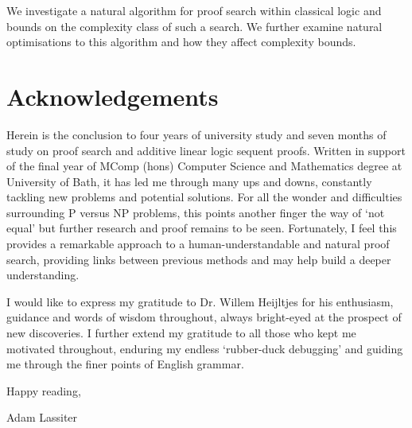 \abstract
    We investigate a natural algorithm for proof search within classical logic and bounds on the complexity class of such a search.
    We further examine natural optimisations to this algorithm and how they affect complexity bounds.
\newpage

\section*{Acknowledgements}
    Herein is the conclusion to four years of university study and seven months of study on proof search and additive linear logic sequent proofs.
    Written in support of the final year of MComp (hons) Computer Science and Mathematics degree at University of Bath, it has led me through many ups and downs, constantly tackling new problems and potential solutions.
    For all the wonder and difficulties surrounding P versus NP problems, this points another finger the way of `not equal' but further research and proof remains to be seen.
    Fortunately, I feel this provides a remarkable approach to a human-understandable and natural proof search, providing links between previous methods and may help build a deeper understanding.

    I would like to express my gratitude to Dr. Willem Heijltjes for his enthusiasm, guidance and words of wisdom throughout, always bright-eyed at the prospect of new discoveries.
    I further extend my gratitude to all those who kept me motivated throughout, enduring my endless `rubber-duck debugging' and guiding me through the finer points of English grammar.

    Happy reading,\par
    Adam Lassiter
\newpage


\tableofcontents
\newpage




